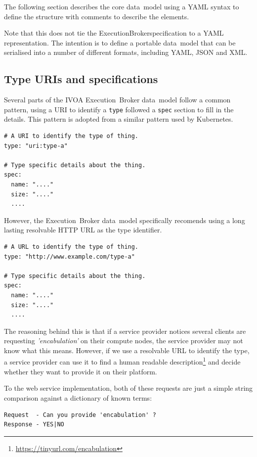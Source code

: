 \documentclass[11pt,a4paper]{ivoa}
\newcommand{\datamodel} {data~model}
\newcommand{\webservice} {web service}
\newcommand{\ivoa} {IVOA}
\newcommand{\execbrokerclass} {ExecutionBroker}
\newcommand{\executionbroker} {Execution~Broker}
\newcommand{\kubernetes} {Kubernetes}
\newcommand{\codeword}[1] {\texttt{#1}}
\newcommand{\footurl}[1] {\footnote{\url{#1}}}
\begin{document}
The following section describes the core \datamodel{} using a YAML syntax
to define the structure with comments to describe the elements.

Note that this does not tie the \execbrokerclass specification to a YAML representation.
The intention is to define a portable \datamodel{} that can be serialised
into a number of different formats, including YAML, JSON and XML.

\subsection{Type URIs and specifications}
\label{type-and-spec}

Several parts of the \ivoa{} \executionbroker{} \datamodel{} follow a common pattern, using a URI
to identify a \codeword{type} followed a \codeword{spec} section to fill in the details.
This pattern is adopted from a similar pattern used by \kubernetes{}.

\begin{lstlisting}[]
# A URI to identify the type of thing.
type: "uri:type-a"

# Type specific details about the thing.
spec:
  name: "...."
  size: "...."
  ....
\end{lstlisting}

However, the \executionbroker{} \datamodel{} specifically recomends using a long lasting resolvable
HTTP URL as the type identifier.

\begin{lstlisting}[]
# A URL to identify the type of thing.
type: "http://www.example.com/type-a"

# Type specific details about the thing.
spec:
  name: "...."
  size: "...."
  ....
\end{lstlisting}

The reasoning behind this is that if a service provider notices several clients are requesting
\textit{'encabulation'} on their compute nodes, the service provider may not know what this means.
However, if we use a resolvable URL to identify the type, a service provider can use it to find a
human readable description\footurl{https://tinyurl.com/encabulation} and decide whether they want
to provide it on their platform.

To the \webservice{} implementation, both of these requests are just a simple string comparison against a
dictionary of known terms:

\begin{lstlisting}[]
Request  - Can you provide 'encabulation' ?
Response - YES|NO
\end{lstlisting}
\end{document}

